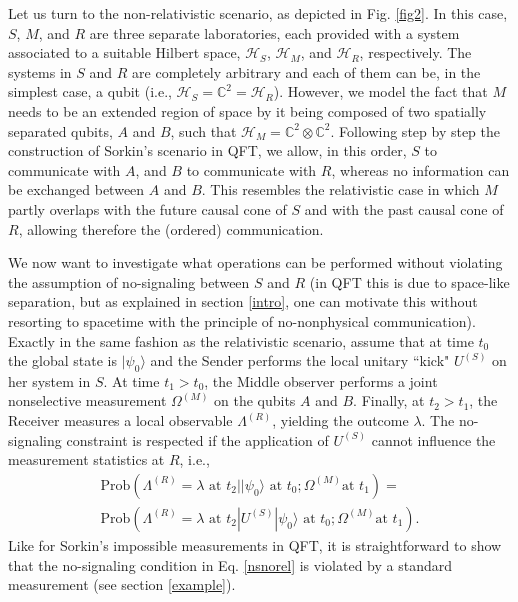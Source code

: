 \documentclass[12pt]{article}
\newcommand{\ket}[1]{| {#1} \rangle} %
\begin{document}
Let us turn to the non-relativistic scenario, as depicted in Fig. \ref{fig2}. In this case, $S$, $M$, and $R$ are three separate laboratories, each provided with a system associated to a suitable Hilbert space, $\mathcal{H}_S$,  $\mathcal{H}_M$, and  $\mathcal{H}_R$, respectively. The systems in $S$ and $R$ are completely arbitrary and each of them can be, in the simplest case,  a qubit (i.e., $\mathcal{H}_S=\mathbb{C}^2=\mathcal{H}_R$). However, we model the fact that $M$ needs to be an extended region of space by it being composed of two spatially separated qubits, $A$ and $B$, such that $\mathcal{H}_M=\mathbb{C}^2 \otimes \mathbb{C}^2$. Following step by step the construction of Sorkin's scenario in QFT, we allow, in this order, $S$ to communicate with $A$, and $B$ to communicate with $R$, whereas no information can be exchanged between $A$ and $B$. This resembles the relativistic case in which $M$ partly overlaps with the future causal cone of $S$ and with the past causal cone of $R$, allowing therefore the (ordered) communication.

We now want to investigate what operations can be performed without violating the assumption of no-signaling between $S$ and $R$ (in QFT this is due to space-like separation, but as explained in section \ref{intro}, one can motivate this without resorting to spacetime with the principle of no-nonphysical communication).
Exactly in the same fashion as the relativistic scenario, assume that at time $t_0$ the global state is $\ket{\psi_0}$ and the Sender performs the local  unitary ``kick" $U^{(S)}$ on her system in $S$. At time $t_1 >t_0$, the Middle observer performs a joint nonselective measurement $\Omega^{(M)}$ on the qubits $A$ and $B$. Finally, at $t_2 > t_1$, the Receiver measures a local observable $\Lambda^{(R)}$, yielding the outcome $\lambda$. The no-signaling constraint is respected if the application of $U^{(S)}$ cannot influence the measurement statistics at $R$, i.e.,  
\begin{eqnarray}
\label{nsnorel}
\text{Prob}(\Lambda^{(R)}=\lambda \text{ at } t_2 | \ket{\psi_0} \text{ at } t_0; \Omega^{(M)} \text{at } t_1)=\\
\text{Prob}(\Lambda^{(R)}=\lambda \text{ at } t_2 | U^{(S)}\ket{\psi_0} \text{ at } t_0; \Omega^{(M)} \text{at } t_1).\nonumber
\end{eqnarray}
Like for Sorkin's impossible measurements in QFT, it is straightforward to show  that the no-signaling condition in Eq. \eqref{nsnorel} is violated by a standard measurement (see section \ref{example}). 
\end{document}
